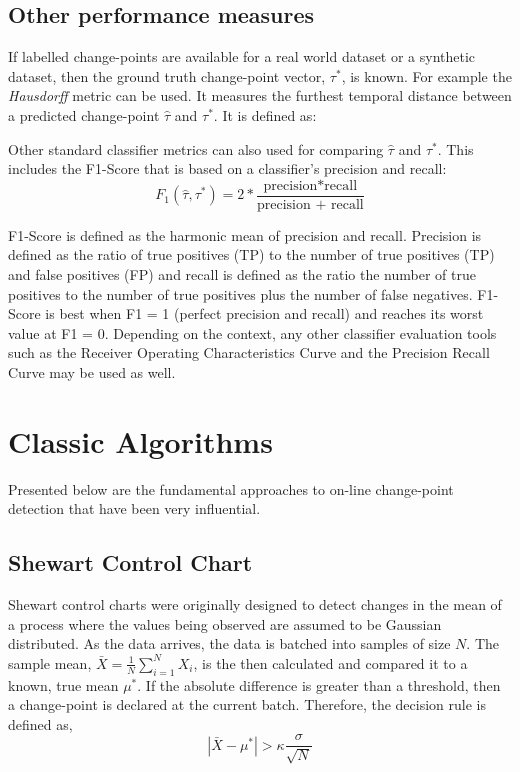 \subsection{Other performance measures}

If labelled change-points are available for a real world dataset or a synthetic dataset, then the ground truth change-point vector, $\tau^*$, is known. For example the \textit{Hausdorff} metric can be used. It measures the furthest temporal distance between a predicted change-point $\hat{\tau}$ and $\tau^*$. It is defined as:

Other standard classifier metrics can also used for comparing $\hat{\tau}$ and $\tau^*$. This includes the  F1-Score that is based on a classifier's precision and recall:
\begin{equation}
F_1(\hat{\tau}, \tau^*) = 2 * \frac{\text{precision*recall}}{\text{precision + recall}}
\end{equation}

 F1-Score is defined as the harmonic mean of precision and recall. Precision is defined as the ratio of true positives (TP) to the
number of true positives (TP) and false positives (FP) and recall is defined as the ratio the number of true positives to the
number of true positives plus the number of false negatives. F1-Score is best when F1 = 1 (perfect precision and recall) and reaches its worst value at F1 = 0. Depending on the context, any other classifier evaluation tools such as the Receiver Operating Characteristics Curve and the Precision Recall Curve may be used as well.

\section{Classic Algorithms}
Presented below are the fundamental approaches to on-line change-point detection that have been very influential. 

\subsection{Shewart Control Chart}
Shewart control charts were originally designed to detect changes in the mean of a process where the values being observed are assumed to be Gaussian distributed. As the data arrives, the data is batched into samples of size $N$.  The sample mean, $\bar{X}=\frac{1}{N} \sum_{i=1}^N X_i$, is the then calculated and compared it to a known, true mean $\mu^*$. If the absolute difference is greater than a threshold, then a change-point is declared at the current batch. Therefore, the decision rule is defined as,
\begin{equation}
|\bar{X}-\mu^*| > \kappa \frac{\sigma}{\sqrt{N}}
\end{equation}

